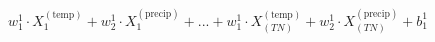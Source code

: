 \documentclass[preview]{standalone}
\begin{document}
\begin{align*}
w_{1}^{1} \cdot X_{1}^{(\text{temp})}+w_{2}^{1} \cdot X_{1}^{(\text{precip})}+...+w_{1}^{1} \cdot X_{(TN)}^{(\text{temp})}+w_{2}^{1} \cdot X_{(TN)}^{(\text{precip})}+b_{1}^{1}
\end{align*}
\end{document}
